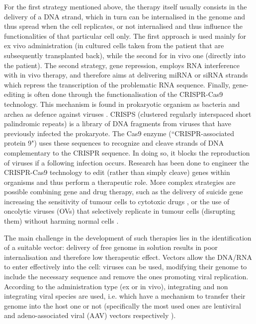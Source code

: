 For the first strategy mentioned above, the therapy itself usually consists in the delivery of a DNA strand, which in turn can be internalised in the genome and thus spread when the cell replicates, or not internalised and thus influence the functionalities of that particular cell only. The first approach is used mainly for ex vivo administration (in cultured cells taken from the patient that are subsequently transplanted back), while the second for in vivo one (directly into the patient).
%
The second strategy, gene repression, employs RNA interference with in vivo therapy, and therefore aims at delivering miRNA or siRNA strands which repress the transcription of the problematic RNA sequence.
%
Finally, gene-editing is often done through the functionalisation of the CRISPR-Cas9 technology. This mechanism is found in prokaryotic organism as bacteria and archea as defence against viruses \cite{Barrangou2015}.
CRISPS (clustered regularly interspaced short palindromic repeats) is a library of DNA fragments from viruses that have previously infected the prokaryote. The Cas9 enzyme (``CRISPR-associated protein 9") uses these sequences to recognize and cleave strands of DNA complementary to the CRISPR sequence. In doing so, it blocks the reproduction of viruses if a following infection occurs. Research has been done to engineer the CRISPR-Cas9 technology to edit (rather than simply cleave) genes within organisms \cite{Zhang2014cas,Hsu2014} and thus perform a therapeutic role.
%
More complex strategies are possible combining gene and drug therapy, such as the delivery of suicide gene increasing the sensitivity of tumour cells to cytotoxic drugs \cite{Oldfield1993}, or the use of oncolytic viruses (OVs) that selectively replicate in tumour cells (disrupting them) without harming normal cells \cite{Lawler2017}.

The main challenge in the development of such therapies lies in the identification of a suitable vector: delivery of free genome in solution results in poor internalisation and therefore low therapeutic effect. Vectors allow the DNA/RNA to enter effectively into the cell: viruses can be used, modifying their genome to include the necessary sequence and remove the ones promoting viral replication.
%
According to the administration type (ex or in vivo), integrating and non integrating viral species are used, i.e. which have a mechanism to transfer their genome into the host one or not (specifically the most used ones are lentiviral and adeno-associated viral (AAV) vectors respectively \cite{Naldini2011,Mingozzi2011}).

